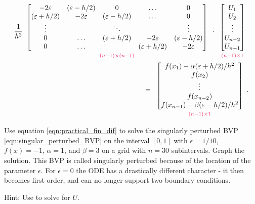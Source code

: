 \begin{align}
    \label{eqn:practical_fin_dif}
    \begin{split}
\frac{1}{h^2}
\begin{array}{c}
\begin{bmatrix}-2\epsilon & (\epsilon - h/2) &0&\hdots &0 \\ (\epsilon + h/2) &-2\epsilon & (\epsilon - h/2) &\hdots &0\\ \vdots &  & \ddots & &\vdots \\
0 & \hdots & (\epsilon + h/2) &-2\epsilon & (\epsilon - h/2) \\ 0 & \hdots & & (\epsilon + h/2) &-2\epsilon
\end{bmatrix}\\
{\scriptstyle\textcolor{red}{(n-1)\times(n-1)}}
\end{array}
\cdot
\begin{array}{c}
\begin{bmatrix}U_1\\U_2\\ \vdots \\U_{n-2} \\U_{n-1}\end{bmatrix}\\
{\scriptstyle\textcolor{red}{(n-1)\times1}}
\end{array}\\
 =
 \begin{array}{c}
 \begin{bmatrix}f(x_1) -\alpha(\epsilon + h/2)/h^2 \\f(x_2)\\ \vdots \\ f(x_{n-2})\\ f(x_{n-1})-\beta(\epsilon - h/2)/h^2 \end{bmatrix}\\
 {\scriptstyle\textcolor{red}{(n-1)\times1}}
 \end{array}.
    \end{split}
\end{align}



\begin{problem}
Use equation \eqref{eqn:practical_fin_dif} to solve the singularly perturbed BVP \eqref{eqn:singular_perturbed_BVP} on the interval $[0,1]$ with $\epsilon = 1/10$, $f(x) = -1$, $\alpha=1$, and $\beta=3$ on a grid with $n=30$ subintervals. Graph the solution.
This BVP is called singularly perturbed because of the location of the parameter $\epsilon$.
For $\epsilon = 0$ the ODE has a drastically different character - it then becomes first order, and can no longer support two boundary conditions.
    \label{prob:finitedifference2:prob1}

Hint: Use  to solve for $U$.
\end{problem}

